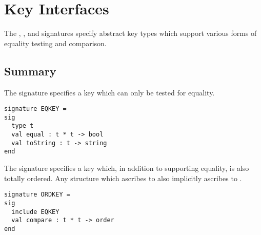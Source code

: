 \chapter{Key Interfaces}
\label{ch:key-interface}

\begin{cluster}
\label{grp:grm:key-interface::eqkey}

\begin{gram}
\label{grm:key-interface::eqkey}
\label{ch:key-interface}
\begin{preamble}
The , , and  signatures specify abstract
key types which support various forms of equality testing and comparison.
\end{preamble}

\end{gram}
\end{cluster}


\section{Summary}
\label{sec:key-interface::summary}

\begin{cluster}
\label{grp:grm:key-interface::signature}

\begin{gram}
\label{grm:key-interface::signature}
The  signature specifies a key which can only be tested for
equality.
\begin{verbatim}
signature EQKEY =
sig
  type t
  val equal : t * t -> bool
  val toString : t -> string
end
\end{verbatim}

\end{gram}
\end{cluster}

\begin{cluster}
\label{grp:grm:key-interface::ordkey}

\begin{gram}
\label{grm:key-interface::ordkey}
The  signature specifies a key which, in addition to supporting
equality, is also totally ordered. Any structure which ascribes to 
also implicitly ascribes to .
\begin{verbatim}
signature ORDKEY =
sig
  include EQKEY
  val compare : t * t -> order
end
\end{verbatim}

\end{gram}
\end{cluster}

